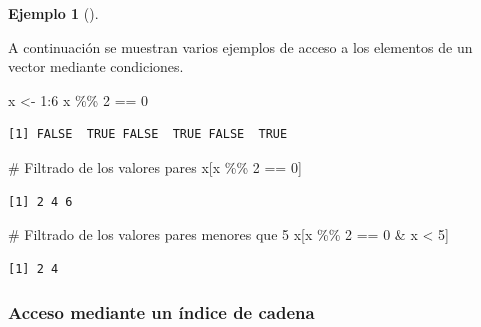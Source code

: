 \documentclass[
  a4paper,
]{scrreport}
\newenvironment{Shaded}{\begin{snugshade}}{\end{snugshade}}
\newcommand{\CommentTok}[1]{\textcolor[rgb]{0.37,0.37,0.37}{#1}}
\newcommand{\DecValTok}[1]{\textcolor[rgb]{0.68,0.00,0.00}{#1}}
\newcommand{\NormalTok}[1]{\textcolor[rgb]{0.00,0.23,0.31}{#1}}
\newcommand{\OtherTok}[1]{\textcolor[rgb]{0.00,0.23,0.31}{#1}}
\newcommand{\SpecialCharTok}[1]{\textcolor[rgb]{0.37,0.37,0.37}{#1}}
\theoremstyle{definition}
\theoremstyle{definition}
\newtheorem{example}{Ejemplo}[chapter]
\theoremstyle{remark}
\begin{document}
\leavevmode{}%
\begin{example}[]\label{exm-filtros}

A continuación se muestran varios ejemplos de acceso a los elementos de
un vector mediante condiciones.

\begin{Shaded}
\begin{Highlighting}[]
\NormalTok{x }\OtherTok{\textless{}{-}} \DecValTok{1}\SpecialCharTok{:}\DecValTok{6}
\NormalTok{x }\SpecialCharTok{\%\%} \DecValTok{2} \SpecialCharTok{==} \DecValTok{0}
\end{Highlighting}
\end{Shaded}

\begin{verbatim}
[1] FALSE  TRUE FALSE  TRUE FALSE  TRUE
\end{verbatim}

\begin{Shaded}
\begin{Highlighting}[]
\CommentTok{\# Filtrado de los valores pares}
\NormalTok{x[x }\SpecialCharTok{\%\%} \DecValTok{2} \SpecialCharTok{==} \DecValTok{0}\NormalTok{]}
\end{Highlighting}
\end{Shaded}

\begin{verbatim}
[1] 2 4 6
\end{verbatim}

\begin{Shaded}
\begin{Highlighting}[]
\CommentTok{\# Filtrado de los valores pares menores que 5}
\NormalTok{x[x }\SpecialCharTok{\%\%} \DecValTok{2} \SpecialCharTok{==} \DecValTok{0} \SpecialCharTok{\&}\NormalTok{ x }\SpecialCharTok{\textless{}} \DecValTok{5}\NormalTok{]}
\end{Highlighting}
\end{Shaded}

\begin{verbatim}
[1] 2 4
\end{verbatim}

\end{example}

\hypertarget{acceso-mediante-un-uxedndice-de-cadena}{%
\subsubsection{Acceso mediante un índice de
cadena}\label{acceso-mediante-un-uxedndice-de-cadena}}
\end{document}
